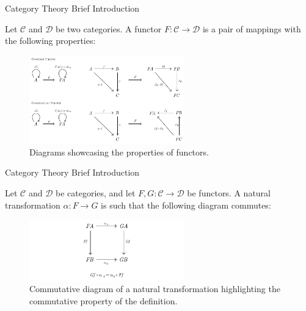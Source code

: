 \documentclass[aspectratio=169,xcolor=dvipsnames,10pt]{beamer}
\theoremstyle{definition}
\begin{document}
\begin{frame}[fragile]{Category Theory Brief Introduction}
	\begin{definition}[Functor]
		Let $\mathcal C$ and $\mathcal D$ be two categories. A functor $F: \mathcal C \to \mathcal D$ is
		a pair of mappings with the following properties:
		\begin{figure}[H]
			\begin{center}
				\includegraphics[width=0.6\textwidth]{./figs/Functor.pdf}
			\end{center}
			\caption{Diagrams showcasing the properties of functors.}
			\label{fig:Functor}
		\end{figure}
	\end{definition}

\end{frame}

\begin{frame}[fragile]{Category Theory Brief Introduction}
	\begin{definition}
		Let $\mathcal C$ and $\mathcal D$ be categories, and let $F,G:\mathcal C \to \mathcal D$ be functors.
		A natural transformation $\alpha: F \to G$ is such that the following diagram commutes:
		\begin{figure}[H]
			\begin{center}
				\includegraphics[width=0.60\textwidth]{./figs/NaturalTransformation.pdf}
			\end{center}
			\caption{Commutative diagram of a natural transformation highlighting the commutative property of the definition.}
			\label{fig:NaturalTransformation}
		\end{figure}
	\end{definition}
\end{frame}
\end{document}
